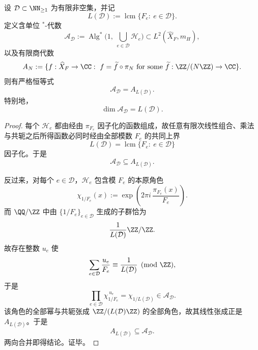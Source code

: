 \begin{theorem}\label{thm:conclusion-fibadic-finite-depth-family-algebra-closure}
设 \(\mathcal D\subset \NN_{\ge 1}\) 为有限非空集，并记
\[
L(\mathcal D):=\operatorname{lcm}\{F_e:\ e\in \mathcal D\}.
\]
定义含单位 \(^*\)-代数
\[
\mathcal A_{\mathcal D}
:=
\operatorname{Alg}^{*}\!\bigl(1,\ \bigcup_{e\in \mathcal D}\mathcal H_e\bigr)
\subset L^2(\widehat X_F,m_H),
\]
以及有限商代数
\[
A_N:=
\{f:\widehat X_F\to \CC:\ f=\widetilde f\circ \pi_N
\text{ for some }\widetilde f:\ZZ/(N\ZZ)\to\CC\}.
\]
则有严格恒等式
\[
\mathcal A_{\mathcal D}=A_{L(\mathcal D)}.
\]
特别地，
\[
\dim \mathcal A_{\mathcal D}=L(\mathcal D).
\]
\end{theorem}
\begin{proof}
每个 \(\mathcal H_e\) 都由经由 \(\pi_{F_e}\) 因子化的函数组成，故任意有限次线性组合、乘法与共轭之后所得函数必同时经由全部模数 \(F_e\) 的共同上界
\[
L(\mathcal D)=\operatorname{lcm}\{F_e:\ e\in \mathcal D\}
\]
因子化。于是
\[
\mathcal A_{\mathcal D}\subseteq A_{L(\mathcal D)}.
\]

反过来，对每个 \(e\in \mathcal D\)，\(\mathcal H_e\) 包含模 \(F_e\) 的本原角色
\[
\chi_{1/F_e}(x):=\exp\!\left(2\pi i\,\frac{\pi_{F_e}(x)}{F_e}\right).
\]
而 \(\QQ/\ZZ\) 中由 \(\{1/F_e\}_{e\in \mathcal D}\) 生成的子群恰为
\[
\frac{1}{L(\mathcal D)}\ZZ/\ZZ.
\]
故存在整数 \(u_e\) 使
\[
\sum_{e\in \mathcal D}\frac{u_e}{F_e}\equiv \frac{1}{L(\mathcal D)}\pmod{\ZZ},
\]
于是
\[
\prod_{e\in \mathcal D}\chi_{1/F_e}^{\,u_e}
=
\chi_{1/L(\mathcal D)}
\in
\mathcal A_{\mathcal D}.
\]
该角色的全部幂与共轭张成 \(\ZZ/(L(\mathcal D)\ZZ)\) 的全部角色，故其线性张成正是 \(A_{L(\mathcal D)}\)。于是
\[
A_{L(\mathcal D)}\subseteq \mathcal A_{\mathcal D}.
\]
两向合并即得结论。证毕。
\end{proof}

